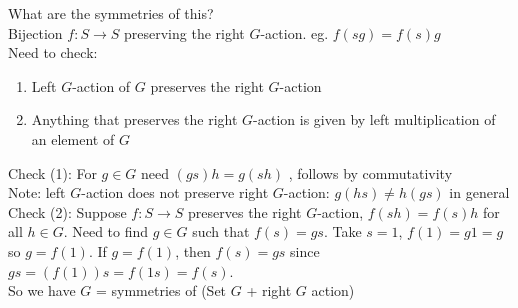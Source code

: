 \noindent
What are the symmetries of this? \\
Bijection $f : S \to S$ preserving the right $G$-action. eg. $f(sg) = f(s)g$ \\
Need to check: 
\begin{enumerate}
    \item Left $G$-action of $G$ preserves the right $G$-action 
    \item Anything that preserves the right $G$-action is given by left multiplication of an element of $G$
\end{enumerate} 

\noindent
Check (1): For $g \in G$ need $(gs)h = g(sh)$ , follows by commutativity \\
Note: left $G$-action does not preserve right $G$-action: $g(hs) \neq h(gs)$ in general \\

\noindent
Check (2): Suppose $f: S \to S$ preserves the right $G$-action, $f(sh) = f(s)h$ for all $h \in G$. Need to find $g \in G$ such that $f(s) = gs$. Take $s=1$, $f(1)=g1=g$ so $g=f(1)$. If $g = f(1)$, then $f(s)=gs$ since $gs = (f(1))s = f(1s) = f(s)$. \\
So we have $G$ = symmetries of (Set $G$ + right $G$ action) 

